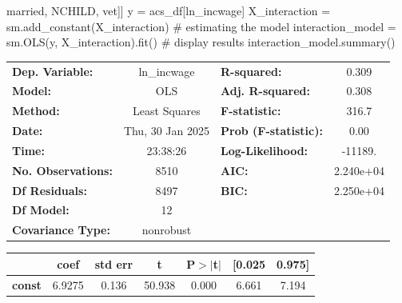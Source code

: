 \documentclass[
  letterpaper,
  DIV=11,
  numbers=noendperiod]{scrartcl}
\newenvironment{Shaded}{\begin{snugshade}}{\end{snugshade}}
\newcommand{\CommentTok}[1]{\textcolor[rgb]{0.37,0.37,0.37}{#1}}
\newcommand{\NormalTok}[1]{\textcolor[rgb]{0.00,0.23,0.31}{#1}}
\newcommand{\OperatorTok}[1]{\textcolor[rgb]{0.37,0.37,0.37}{#1}}
\newcommand{\StringTok}[1]{\textcolor[rgb]{0.13,0.47,0.30}{#1}}
\begin{document}
\begin{Shaded}
\begin{Highlighting}[]
                        \StringTok{\textquotesingle{}married\textquotesingle{}}\NormalTok{, }\StringTok{\textquotesingle{}NCHILD\textquotesingle{}}\NormalTok{, }\StringTok{\textquotesingle{}vet\textquotesingle{}}\NormalTok{]]}
\NormalTok{y }\OperatorTok{=}\NormalTok{ acs\_df[}\StringTok{\textquotesingle{}ln\_incwage\textquotesingle{}}\NormalTok{]}
\NormalTok{X\_interaction }\OperatorTok{=}\NormalTok{ sm.add\_constant(X\_interaction)}
\CommentTok{\# estimating the model}
\NormalTok{interaction\_model }\OperatorTok{=}\NormalTok{ sm.OLS(y, X\_interaction).fit()}
\CommentTok{\# display results}
\NormalTok{interaction\_model.summary()}
\end{Highlighting}
\end{Shaded}

\begin{center}
\begin{tabular}{lclc}
\toprule
\textbf{Dep. Variable:}    &   ln\_incwage    & \textbf{  R-squared:         } &     0.309   \\
\textbf{Model:}            &       OLS        & \textbf{  Adj. R-squared:    } &     0.308   \\
\textbf{Method:}           &  Least Squares   & \textbf{  F-statistic:       } &     316.7   \\
\textbf{Date:}             & Thu, 30 Jan 2025 & \textbf{  Prob (F-statistic):} &     0.00    \\
\textbf{Time:}             &     23:38:26     & \textbf{  Log-Likelihood:    } &   -11189.   \\
\textbf{No. Observations:} &        8510      & \textbf{  AIC:               } & 2.240e+04   \\
\textbf{Df Residuals:}     &        8497      & \textbf{  BIC:               } & 2.250e+04   \\
\textbf{Df Model:}         &          12      & \textbf{                     } &             \\
\textbf{Covariance Type:}  &    nonrobust     & \textbf{                     } &             \\
\bottomrule
\end{tabular}
\begin{tabular}{lcccccc}
                        & \textbf{coef} & \textbf{std err} & \textbf{t} & \textbf{P$> |$t$|$} & \textbf{[0.025} & \textbf{0.975]}  \\
\midrule
\textbf{const}          &       6.9275  &        0.136     &    50.938  &         0.000        &        6.661    &        7.194     \\

\end{tabular}
\end{center}
\end{document}
